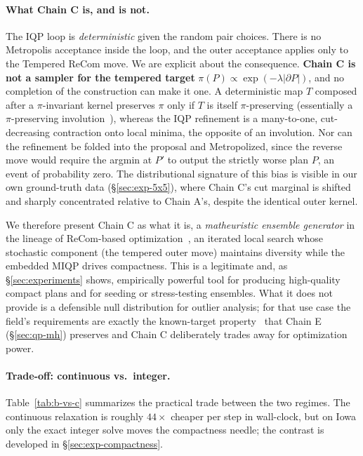 \documentclass[11pt]{article}
\begin{document}
\paragraph{What Chain C is, and is not.}\label{sec:chain-c-honest}
The IQP loop is \emph{deterministic} given the random pair choices. There is no Metropolis acceptance inside the loop, and the outer
acceptance applies only to the Tempered ReCom move. We are explicit
about the consequence. \textbf{Chain C is not a sampler for the
tempered target} $\pi(P) \propto \exp(-\lambda|\partial P|)$, and no
completion of the construction can make it one. A deterministic map
$T$ composed after a $\pi$-invariant kernel preserves $\pi$ only if
$T$ is itself $\pi$-preserving (essentially a $\pi$-preserving
involution~\cite{tierney1998note}), whereas the IQP refinement is a
many-to-one, cut-decreasing contraction onto local minima, the
opposite of an involution. Nor can the refinement be folded into the
proposal and Metropolized, since the reverse move would require the
argmin at $P'$ to output the strictly worse plan $P$, an event of
probability zero. The distributional signature of this bias is visible
in our own ground-truth data (\S\ref{sec:exp-5x5}), where Chain C's cut
marginal is shifted and sharply concentrated relative to Chain A's,
despite the identical outer kernel.

We therefore present Chain C as what it is, a \emph{matheuristic
ensemble generator} in the lineage of ReCom-based
optimization~\cite{cannon2023voting,brous2025recom}, an iterated
local search whose stochastic component (the tempered outer move)
maintains diversity while the embedded MIQP drives compactness. This
is a legitimate and, as \S\ref{sec:experiments} shows, empirically
powerful tool for producing high-quality compact plans and for
seeding or stress-testing ensembles. What it does not provide is a
defensible null distribution for outlier analysis; for that use case
the field's requirements are exactly the known-target
property~\cite{cannon2022spanning,mccartan2023sequential} that
Chain E (\S\ref{sec:qp-mh}) preserves and Chain C deliberately trades
away for optimization power.

\paragraph{Trade-off: continuous vs.\ integer.}\label{sec:iqp-pareto}
Table~\ref{tab:b-vs-c} summarizes the practical trade between the two
regimes. The continuous relaxation is roughly $44\times$ cheaper per
step in wall-clock, but on Iowa only the exact integer solve moves the
compactness needle; the contrast is developed in
\S\ref{sec:exp-compactness}.
\end{document}
